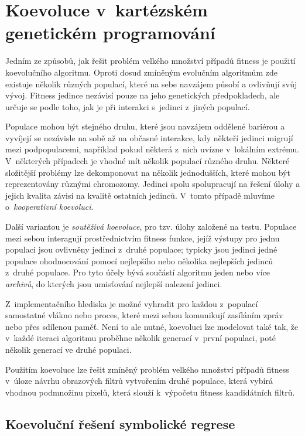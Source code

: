 \section{Koevoluce v~kartézském genetickém programování}

Jedním ze způsobů, jak řešit problém velkého množství případů fitness je použití koevolučního algoritmu. Oproti dosud zmíněným evolučním algoritmům zde existuje několik různých populací, které na sebe navzájem působí a ovlivňují svůj vývoj. Fitness jedince nezávisí pouze na jeho genetických předpokladech, ale určuje se podle toho, jak  je při interakci s~jedinci z~jiných populací.

Populace mohou být stejného druhu, které jsou navzájem oddělené bariérou a vyvíjejí se nezávisle na sobě až na občasné interakce, kdy někteří jedinci migrují mezi podpopulacemi, například pokud některá z~nich uvízne v~lokálním extrému. V~některých případech je vhodné mít několik populací různého druhu. Některé složitější problémy lze dekomponovat na několik jednodušších, které mohou být reprezentovány různými chromozomy. Jedinci spolu spolupracují na řešení úlohy a jejich kvalita závisí na kvalitě ostatních jedinců. V~tomto případě mluvíme o~\emph{kooperativní koevoluci}.

Další variantou je \emph{soutěživá koevoluce}, pro tzv. úlohy založené na testu. Populace mezi sebou interagují prostřednictvím fitness funkce, jejíž výstupy pro jednu populaci jsou ovlivněny jedinci z~druhé populace; typicky jsou jedinci jedné populace ohodnocování pomocí nejlepšího nebo několika nejlepších jedinců z~druhé populace. Pro tyto účely bývá součástí algoritmu jeden nebo více \emph{archivů}, do kterých jsou umisťování nejlepší nalezení jedinci.

Z~implementačního hlediska je možné vyhradit pro každou z~populací samostatné vlákno nebo proces, které mezi sebou komunikují zasíláním zpráv nebo přes sdílenou paměť. Není to ale nutné, koevoluci lze modelovat také tak, že v~každé iteraci algoritmu proběhne několik generací v~první populaci, poté několik generací ve druhé populaci.

Použitím koevoluce lze řešit zmíněný problém velkého množství případů fitness v~úloze návrhu obrazových filtrů vytvořením druhé populace, která vybírá vhodnou podmnožinu pixelů, která slouží k~výpočetu fitness kandidátních filtrů.


\subsection{Koevoluční řešení symbolické regrese}

